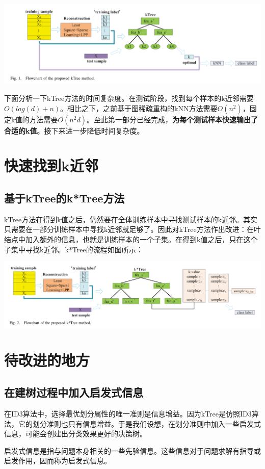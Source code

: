 \documentclass{ctexart}
\begin{document}
	\includegraphics[scale=0.3]{kTree}
	
	下面分析一下kTree方法的时间复杂度。在测试阶段，找到每个样本的k近邻需要$ O(log(d)+ n) $。相比之下，之前基于图稀疏重构的kNN方法需要$ O(n^2) $，固定k值的方法需要$ O(n^{2}d) $。至此第一部分已经完成，{\bfseries 为每个测试样本快速输出了合适的k值}。接下来进一步降低时间复杂度。
	\section{快速找到k近邻}
	\subsection{基于kTree的k*Tree方法}
	kTree方法在得到k值之后，仍然要在全体训练样本中寻找测试样本的k近邻。其实只需要在一部分训练样本中寻找k近邻就足够了。因此对kTree方法作出改进：在叶结点中加入额外的信息，也就是训练样本的一个子集。在得到k值之后，只在这个子集中寻找k近邻。k*Tree的流程如图所示：
	
	\includegraphics[scale=0.3]{kStarTree}
	
	\section{待改进的地方}
	\subsection{在建树过程中加入启发式信息}
	在ID3算法中，选择最优划分属性的唯一准则是信息增益。因为kTree是仿照ID3算法，它的划分准则也只有信息增益。于是我们设想，在划分准则中加入一些启发式信息，可能会创建出分类效果更好的决策树。
	
	启发式信息是指与问题本身相关的一些先验信息。这些信息对于问题求解有指导或启发作用，因而称为启发式信息。
	
\end{document}
